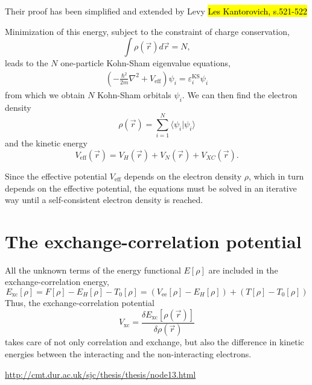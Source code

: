 \documentclass[11pt]{scrbook}   %
\newcommand{\comment}[1]{\hl{#1}}
\begin{document}
Their proof has been simplified and extended by Levy 
\comment{Les Kantorovich, s.521-522}

Minimization of this energy, subject to the constraint
of charge conservation,
\begin{equation}
  \int \rho(\vec{r})d\vec{r} = N,
\end{equation}
leads to the $N$ one-particle Kohn-Sham eigenvalue equations,
\begin{align}
  \left(-\frac{\hbar^2}{2m}\nabla^2 + V_{\text{eff}}\right) \psi_i =
  \varepsilon_i^\text{KS} \psi_i
\end{align}
from which we obtain $N$ Kohn-Sham orbitals $\psi_i$. We can then 
find the electron density
\begin{equation}
  \rho(\vec{r}) = \sum_{i=1}^N \langle \psi_i|\psi_i\rangle
\end{equation}
and the kinetic energy
\begin{equation}
  V_{\text{eff}}(\vec{r}) = V_H(\vec{r}) + V_N(\vec{r}) + V_{XC}(\vec{r}).
  \label{eq:eff-pot}
\end{equation}

Since the effective potential $V_{\text{eff}}$ depends on the electron 
density $\rho$, which in turn depends on the effective potential, the equations
must be solved in an iterative way until a self-consistent electron density is 
reached.

\section{The exchange-correlation potential}

All the unknown terms of the energy functional $E[\rho]$ are included in the exchange-correlation energy, 
\begin{equation}
  E_{\mathrm{xc}}[\rho] = F[\rho] - E_H[\rho] - T_0[\rho] = (V_{\text{ee}}[\rho] - E_H[\rho]) + (T[\rho] - T_0[\rho])
\end{equation}
Thus, the exchange-correlation potential
\begin{equation}
  V_{\mathrm{xc}} = \frac{\delta E_{\mathrm{xc}}[\rho(\vec{r})]}{\delta\rho(\vec{r})}
\end{equation}
takes care of not only correlation and exchange, but also the difference in kinetic energies between the interacting and the non-interacting electrons.

\url{http://cmt.dur.ac.uk/sjc/thesis/thesis/node13.html}
\end{document}

